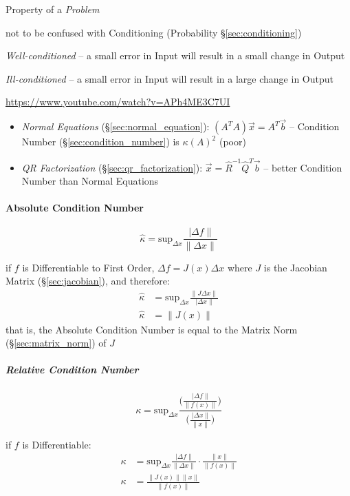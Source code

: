 Property of a \emph{Problem}

\fist not to be confused with Conditioning (Probability
\S\ref{sec:conditioning})

\emph{Well-conditioned} -- a small error in Input will result in a small change
in Output

\emph{Ill-conditioned} -- a small error in Input will result in a large change
in Output

\url{https://www.youtube.com/watch?v=APh4ME3C7UI}

\begin{itemize}
  \item \emph{Normal Equations} (\S\ref{sec:normal_equation}): $(A^TA)\vec{x} =
    A^T\vec{b}$ -- Condition Number (\S\ref{sec:condition_number}) is
    $\kappa(A)^2$ (poor)
  \item \emph{QR Factorization} (\S\ref{sec:qr_factorization}): $\vec{x} =
    \hat{R}^{-1}\hat{Q}^T\vec{b}$ -- better Condition Number than Normal
    Equations
\end{itemize}



\paragraph{Absolute Condition Number}\label{sec:absolute_condition_number}
\hfill

\[
  \hat{\kappa} = \mathrm{sup}_{\Delta x} \frac{\ |\Delta f\|}{\|\Delta x\|}
\]

if $f$ is Differentiable to First Order, $\Delta f = J(x) \Delta x$ where $J$
is the Jacobian Matrix (\S\ref{sec:jacobian}), and therefore:
\begin{align*}
  \hat{\kappa} & = \mathrm{sup}_{\Delta x} \frac{\|J\Delta x\|}{\ |\Delta x\|} \\
  \hat{\kappa} & = \|J(x)\|
\end{align*}
that is, the Absolute Condition Number is equal to the Matrix Norm
(\S\ref{sec:matrix_norm}) of $J$



\subparagraph{Relative Condition Number}\label{sec:relative_condition_number}
\hfill

\[
  \kappa = \mathrm{sup}_{\Delta x} \frac{
    \Big(\frac{\ |\Delta f\|}{\|f(x)\|}\Big)
  }{
    \Big(\frac{\ |\Delta x\|}{\|x\|}\Big)
  }
\]

if $f$ is Differentiable:
\begin{align*}
  \kappa & = \mathrm{sup}_{\Delta x}
    \frac{\ |\Delta f\|}{\|\Delta x\|} \cdot \frac{\|x\|}{\|f(x)\|} \\
  \kappa & = \frac{\|J(x)\| \|x\|}{\|f(x)\|}
\end{align*}

